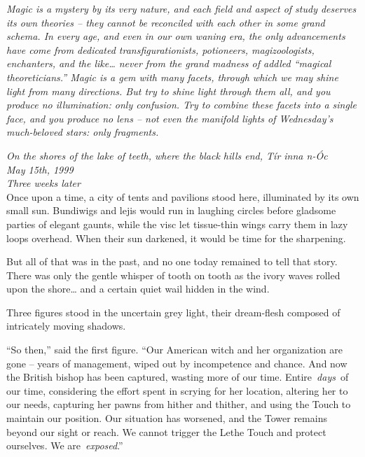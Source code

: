 \emph{Magic is a mystery by its very nature, and each field and aspect
of study deserves its own theories -- they cannot be reconciled with
each other in some grand schema. In every age, and even in our own
waning era, the only advancements have come from dedicated
transfigurationists, potioneers, magizoologists, enchanters, and the
like\ldots{} never from the grand madness of addled ``magical
theoreticians.'' Magic is a gem with many facets, through which we may
shine light from many directions. But try to shine light through them
all, and you produce no illumination: only confusion. Try to combine
these facets into a single face, and you produce no lens -- not even the
manifold lights of Wednesday's much-beloved stars: only fragments.}


\mybreak

\emph{On the shores of the lake of teeth, where the black hills end, Tír
inna n-Óc}\\
\emph{May 15th, 1999}\\
\emph{Three weeks later}\\

Once upon a time, a city of tents and pavilions stood here, illuminated
by its own small sun. Bundiwigs and lejis would run in laughing circles
before gladsome parties of elegant gaunts, while the visc let
tissue-thin wings carry them in lazy loops overhead. When their sun
darkened, it would be time for the sharpening.

But all of that was in the past, and no one today remained to tell that
story. There was only the gentle whisper of tooth on tooth as the ivory
waves rolled upon the shore\ldots{} and a certain quiet wail hidden in
the wind.

Three figures stood in the uncertain grey light, their dream-flesh
composed of intricately moving shadows.

``So then,'' said the first figure. ``Our American witch and her
organization are gone -- years of management, wiped out by incompetence
and chance. And now the British bishop has been captured, wasting more
of our time. Entire~\emph{days}~of our time, considering the effort
spent in scrying for her location, altering her to our needs, capturing
her pawns from hither and thither, and using the Touch to maintain our
position. Our situation has worsened, and the Tower remains beyond our
sight or reach. We cannot trigger the Lethe Touch and protect ourselves.
We are~\emph{exposed}.''

